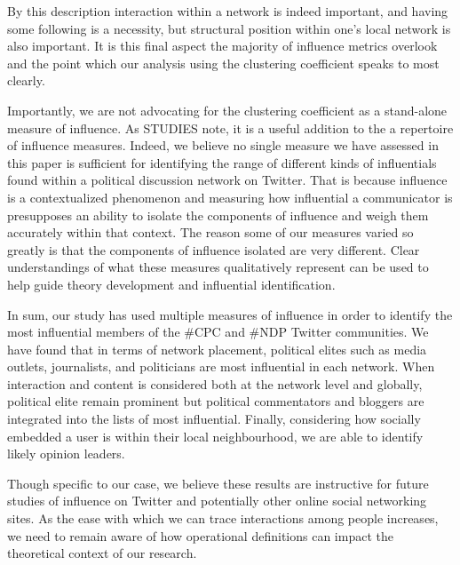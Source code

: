 \documentclass[a4paper,12pt]{article}
\begin{document}
By this description interaction within a network is indeed important, and having some following is a necessity, but structural position within one's local network is also important. It is this final aspect the majority of influence metrics overlook and the point which our analysis using the clustering coefficient speaks to most clearly.

Importantly, we are not advocating for the clustering coefficient as a stand-alone measure of influence. As STUDIES note, it is a useful addition to the a repertoire of influence measures. Indeed, we believe no single measure we have assessed in this paper is sufficient for identifying the range of different kinds of influentials found within a political discussion network on Twitter. That is because influence is a contextualized phenomenon and measuring how influential a communicator is presupposes an ability to isolate the components of influence and weigh them accurately within that context. The reason some of our measures varied so greatly is that the components of influence isolated are very different. Clear understandings of what these measures qualitatively represent can be used to help guide theory development and influential identification.

In sum, our study has used multiple measures of influence in order to identify the most influential members of the \#CPC and \#NDP Twitter communities. We have found that in terms of network placement, political elites such as media outlets, journalists, and politicians are most influential in each network. When interaction and content is considered both at the network level and globally, political elite remain prominent but political commentators and bloggers are integrated into the lists of most influential. Finally, considering how socially embedded a user is within their local neighbourhood, we are able to identify likely opinion leaders. 

Though specific to our case, we believe these results are instructive for future studies of influence on Twitter and potentially other online social networking sites. As the ease with which we can trace interactions among people increases, we need to remain aware of how operational definitions can impact the theoretical context of our research.
\end{document}
